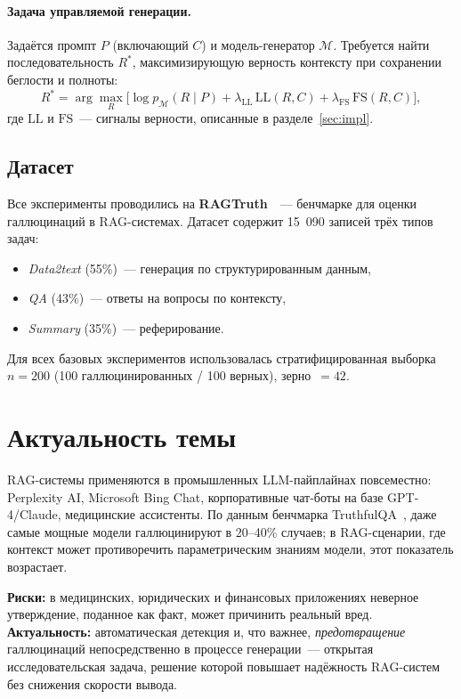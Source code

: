\documentclass[a4paper,12pt]{extarticle}
\newcommand{\LL}{\mathrm{LL}}
\newcommand{\FS}{\mathrm{FS}}
\begin{document}
\paragraph{Задача управляемой генерации.}
Задаётся промпт $P$ (включающий $C$) и модель-генератор $\mathcal{M}$.
Требуется найти последовательность $R^*$, максимизирующую верность контексту
при сохранении беглости и полноты:
\begin{equation}
  R^* = \arg\max_{R} \bigl[\log p_\mathcal{M}(R \mid P) +
        \lambda_\LL\,\LL(R, C) + \lambda_\FS\,\FS(R, C)\bigr],
  \label{eq:objective}
\end{equation}
где $\LL$ и $\FS$~--- сигналы верности, описанные в разделе~\ref{sec:impl}.

\subsection{Датасет}

Все эксперименты проводились на \textbf{RAGTruth}~\cite{ragtruth}~---
бенчмарке для оценки галлюцинаций в RAG-системах. Датасет содержит 15~090
записей трёх типов задач:
\begin{itemize}
  \item \textit{Data2text} (55\%)~--- генерация по структурированным данным,
  \item \textit{QA} (43\%)~--- ответы на вопросы по контексту,
  \item \textit{Summary} (35\%)~--- реферирование.
\end{itemize}
Для всех базовых экспериментов использовалась стратифицированная выборка
$n=200$ (100 галлюцинированных / 100 верных), зерно~$=42$.

\section{Актуальность темы}
\label{sec:relevance}

RAG-системы применяются в промышленных LLM-пайплайнах повсеместно:
Perplexity AI, Microsoft Bing Chat, корпоративные чат-боты на базе
GPT-4/Claude, медицинские ассистенты.
По данным бенчмарка TruthfulQA~\cite{truthfulqa}, даже самые мощные модели
галлюцинируют в 20--40\% случаев; в RAG-сценарии, где контекст может
противоречить параметрическим знаниям модели, этот показатель возрастает.

\textbf{Риски:} в медицинских, юридических и финансовых приложениях
неверное утверждение, поданное как факт, может причинить реальный вред.
\textbf{Актуальность:} автоматическая детекция и, что важнее, \emph{предотвращение}
галлюцинаций непосредственно в процессе генерации~--- открытая исследовательская
задача, решение которой повышает надёжность RAG-систем без снижения скорости
вывода.
\end{document}
